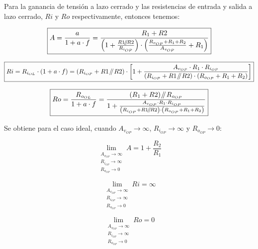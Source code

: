 Para la ganancia de tensión a lazo cerrado y las resistencias de entrada y salida a lazo cerrado, $R{i}$ y $R{o}$ respectivamente, entonces tenemos:


\begin{equation}
\boxed{ A = \frac{a}{1 + a \cdot f} = \frac{R_{1} + R{2}}{ \left( 1 + \frac{R{1} \mathbin{\!/\mkern-5mu/\!} R{2}}{R_{i_{OP}}} \right) \cdot \left( \frac{R_{o_{OP}} + R_{1} + R_{2}}{A_{v_{OP}}} + R_{1} \right) } }
\end{equation}


\begin{equation}
\boxed{ R{i} = R_{i_{OL}} \cdot \left( 1 + a \cdot f \right) = \left(  R_{i_{OP}} + R{1} \mathbin{\!/\mkern-5mu/\!} R{2} \right) \cdot \left[ 1 + \frac{ A_{v_{OP}} \cdot R_{1} \cdot R_{i_{OP}} }{  \left( R_{i_{OP}} + R{1} \mathbin{\!/\mkern-5mu/\!} R{2} \right) \cdot \left( R_{o_{OP}} + R_{1} + R_{2} \right) } \right] }
\end{equation}


\begin{equation}
\boxed{ R{o} = \frac{R_{o_{OL}}}{1 + a \cdot f} = \frac{\left( R_{1} + R{2} \right) \mathbin{\!/\mkern-5mu/\!} R_{o_{OP}}}{1 + \frac{ A_{v_{OP}} \cdot R_{1} \cdot R_{i_{OP}} }{  \left( R_{i_{OP}} + R{1} \mathbin{\!/\mkern-5mu/\!} R{2} \right) \cdot \left( R_{o_{OP}} + R_{1} + R_{2} \right) }} }
\end{equation}


Se obtiene para el caso ideal, cuando $A_{v_{OP}} \longrightarrow \infty$, $R_{i_{OP}} \longrightarrow \infty$ y $R_{o_{OP}} \longrightarrow 0$:

\begin{equation}
\lim_{\substack{A_{v_{OP}} \to \infty \\ R_{i_{OP}} \to \infty \\ R_{o_{OP}} \to 0}} A = 1 + \frac{R_{2}}{R_{1}} 
\end{equation}


\begin{equation}
\lim_{\substack{A_{v_{OP}} \to \infty \\ R_{i_{OP}} \to \infty \\ R_{o_{OP}} \to 0}} R{i} = \infty
\end{equation}


\begin{equation}
\lim_{\substack{A_{v_{OP}} \to \infty \\ R_{i_{OP}} \to \infty \\ R_{o_{OP}} \to 0}} R{o} = 0
\end{equation}

